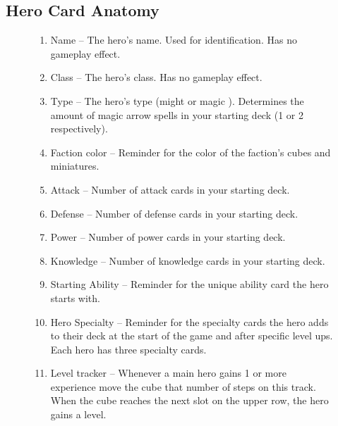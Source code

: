 \clearpage

\subsection*{\hypertarget{Herocard}{Hero Card Anatomy}}
\bigbreak
\begin{figure}[h]
  \begin{minipage}[t]{0.5\textwidth}
    \vspace{0pt}
    \begin{enumerate}[itemsep=5pt]
      \item Name – The hero’s name.
        Used for identification.
        Has no gameplay effect.
      \item Class – The hero’s class.
        Has no gameplay effect.
      \item Type – The hero’s type (might  or magic ).
        Determines the amount of magic arrow spells in your starting deck (1 or 2 respectively).
      \item Faction color – Reminder for the color of the faction’s cubes and miniatures.
      \item Attack – Number of attack cards in your starting deck.
      \item Defense – Number of defense cards in your starting deck.
      \item Power – Number of power cards in your starting deck.
      \item Knowledge – Number of knowledge cards in your starting deck.
      \item Starting Ability – Reminder for the unique ability card the hero starts with.
      \item Hero Specialty – Reminder for the specialty cards the hero adds to their deck at the start of the game and after specific level ups.
        Each hero has three specialty cards.
      \item Level tracker – Whenever a main hero gains 1 or more experience  move the cube that number of steps on this track.
        When the cube reaches the next slot on the upper row, the hero gains a level.
    \end{enumerate}
  \end{minipage}\hfill
  \begin{minipage}[t]{0.48\textwidth}
    \centering
    \vspace{0pt}
    \begin{scriptsize}

\end{scriptsize}
\end{minipage}
\end{figure}
